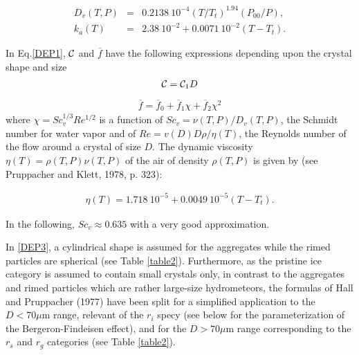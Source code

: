 \begin{eqnarray}
D_v(T,P)&=&0.2138\ 10^{-4}(T/T_t)^{1.94}(P_{00}/P), \\
k_a(T) &=& 2.38\ 10^{-2}+0.0071\ 10^{-2}(T-T_t).
\end{eqnarray}

\noindent In Eq.\ref{DEP1}, $\cal C$ and $\overline{f}$ have the following
expressions depending upon the crystal shape and size
%
\begin{eqnarray}\label{DEP3}
  {\cal C}= {\cal C}_{1}D
\end{eqnarray}
\begin{eqnarray}\label{DEP4}
  \overline{f}=\overline{f}_{0}+\overline{f}_{1}{\chi}+\overline{f}_{2}{\chi}^2
\end{eqnarray}
%
\noindent where ${\chi}=Sc^{1/3}_{v}Re^{1/2}$ is a function of
$Sc_v=\nu(T,P)/D_{v}(T,P)$, the Schmidt number for water vapor and of
$Re=v(D)D\rho/\eta(T)$, the Reynolds number of the flow around a crystal of
size $D$. The dynamic viscosity $\eta(T)=\rho(T,P) \nu(T,P)$ of the air of
density $\rho(T,P)$ is given by (see Pruppacher and Klett, 1978, p. 323):

\begin{eqnarray}
\eta(T)=1.718\ 10^{-5}+0.0049\ 10^{-5}(T-T_t).
\end{eqnarray}

\noindent In the following, $Sc_v\approx0.635$ with a very good approximation.

In \ref{DEP3}, a cylindrical shape is assumed for
the aggregates while the rimed particles are spherical (see Table \ref{table2}).
Furthermore, as the pristine ice category is assumed to contain small crystals
only, in contrast to the aggregates and rimed particles which are rather
large-size hydrometeors, the formulas of Hall and Pruppacher (1977) have been
split for a simplified application to the $D < 70 \mu$m range, relevant of the
$r_i$ specy (see below for the parameterization of the Bergeron-Findeisen
effect), and for the $D > 70 \mu$m range corresponding to the $r_s$ and
$r_g$ categories (see Table \ref{table2}).

